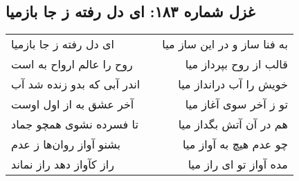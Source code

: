 \begin{center}
\section*{غزل شماره ۱۸۳: ای دل رفته ز جا بازمیا}
\label{sec:0183}
\begin{longtable}{l p{0.5cm} r}
ای دل رفته ز جا بازمیا
&&
به فنا ساز و در این ساز میا
\\
روح را عالم ارواح به است
&&
قالب از روح بپرداز میا
\\
اندر آبی که بدو زنده شد آب
&&
خویش را آب درانداز میا
\\
آخر عشق به از اول اوست
&&
تو ز آخر سوی آغاز میا
\\
تا فسرده نشوی همچو جماد
&&
هم در آن آتش بگداز میا
\\
بشنو آواز روان‌ها ز عدم
&&
چو عدم هیچ به آواز میا
\\
راز کآواز دهد راز نماند
&&
مده آواز تو ای راز میا
\\
\end{longtable}
\end{center}
